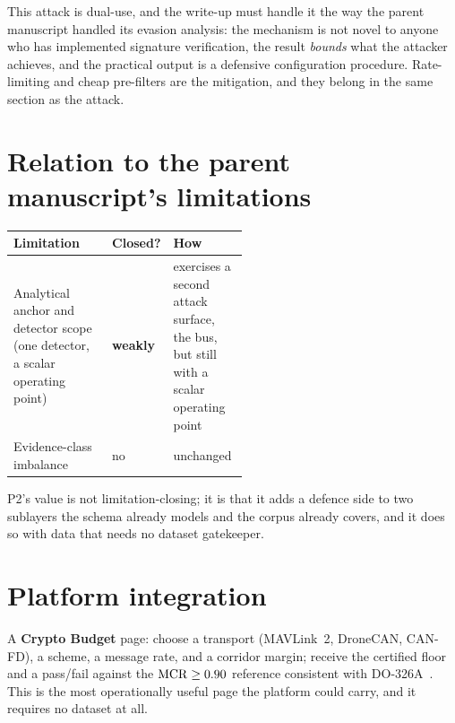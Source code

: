 \documentclass[11pt,a4paper]{article}
\begin{document}
\begin{honestly}
This attack is dual-use, and the write-up must handle it the way the parent
manuscript handled its evasion analysis: the mechanism is not novel to anyone
who has implemented signature verification, the result \emph{bounds} what the
attacker achieves, and the practical output is a defensive configuration
procedure. Rate-limiting and cheap pre-filters are the mitigation, and they
belong in the same section as the attack.
\end{honestly}

\section{Relation to the parent manuscript's limitations}
\begin{center}
\small
\begin{tabularx}{\linewidth}{@{}p{0.42\linewidth}p{0.10\linewidth}X@{}}
\toprule
\textbf{Limitation} & \textbf{Closed?} & \textbf{How} \\
\midrule
Analytical anchor and detector scope (one detector, a scalar operating point) &
\textbf{weakly} &
exercises a second attack surface, the bus, but still with a scalar operating
point \\
Evidence-class imbalance & no & unchanged \\
\bottomrule
\end{tabularx}
\end{center}

\noindent
P2's value is not limitation-closing; it is that it adds a defence side to two
sublayers the schema already models and the corpus already covers, and it does
so with data that needs no dataset gatekeeper.

\section{Platform integration}
A \textbf{Crypto Budget} page: choose a transport (MAVLink~2, DroneCAN, CAN-FD),
a scheme, a message rate, and a corridor margin; receive the certified floor and
a pass/fail against the $\mathrm{MCR}\ge0.90$ reference consistent with
DO-326A~\cite{do326a}. This is the most operationally useful page the platform
could carry, and it requires no dataset at all.
\end{document}
